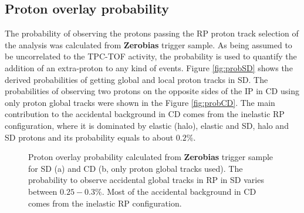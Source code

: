 \subsection{Proton overlay probability}
The probability of observing the protons passing the RP proton track selection of the analysis  was calculated from \textbf{Zerobias} trigger sample. As being assumed to be uncorrelated to the TPC-TOF activity, the probability is used to quantify the addition of an extra-proton to any kind of events. Figure \ref{fig:probSD} shows the derived probabilities of getting global and local proton tracks in SD. The probabilities of observing two protons on the opposite sides of the IP in CD using only proton global tracks were shown in the Figure \ref{fig:probCD}.  The main contribution to the accidental background in CD comes from the inelastic RP configuration, where it is dominated by elastic (halo), elastic and SD, halo and SD protons and its probability equals to about $0.2\%$.
\begin{figure}[H]
	\centering
	\parbox{0.48\textwidth}{
		\centering
		\begin{subfigure}[b]{\linewidth}{
				}
		\end{subfigure}
	}
	\quad
	\parbox{0.48\textwidth}{
		\centering
		\begin{subfigure}[b]{\linewidth}{
				}
		\end{subfigure}
	}%
	\caption[Proton overlay probability calculated from \textbf{Zerobias} trigger sample for SD and CD]{Proton overlay probability calculated from \textbf{Zerobias} trigger sample for SD (a) and CD (b, only proton global tracks used). The probability to observe accidental global tracks in RP in SD varies between $0.25-0.3\%$. Most of the accidental background in CD comes from the inelastic RP configuration.}
	
\end{figure}
